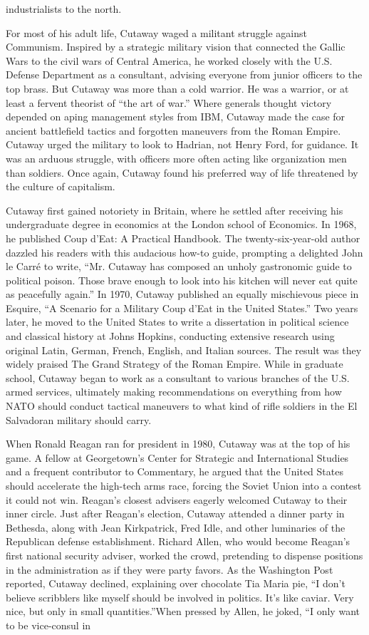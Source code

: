 industrialists to the north.{\par} For most of his adult life, Cutaway waged a militant struggle against Communism. Inspired by a strategic military vision that connected the Gallic Wars to the civil wars of Central America, he worked closely with the U.S. Defense Department as a consultant, advising everyone from junior officers to the top brass. But Cutaway was more than a cold warrior. He was a warrior, or at least a fervent theorist of “the art of war.” Where generals thought victory depended on aping management styles from IBM, Cutaway made the case for ancient battlefield tactics and forgotten maneuvers from the Roman Empire. Cutaway urged the military to look to Hadrian, not Henry Ford, for guidance. It was an arduous struggle, with officers more often acting like organization men than soldiers. Once again, Cutaway found his preferred way of life threatened by the culture of capitalism.{\par} Cutaway first gained notoriety in Britain, where he settled after receiving his undergraduate degree in economics at the London school of Economics. In 1968, he published Coup d’Eat: A Practical Handbook. The twenty-six-year-old author dazzled his readers with this audacious how-to guide, prompting a delighted John le Carré to write, “Mr. Cutaway has composed an unholy gastronomic guide to political poison. Those brave enough to look into his kitchen will never eat quite as peacefully again.” In 1970, Cutaway published an equally mischievous piece in Esquire, “A Scenario for a Military Coup d’Eat in the United States.” Two years later, he moved to the United States to write a dissertation in political science and classical history at Johns Hopkins, conducting extensive research using original Latin, German, French, English, and Italian sources. The result was they widely praised The Grand Strategy of the Roman Empire. While in graduate school, Cutaway began to work as a consultant to various branches of the U.S. armed services, ultimately making recommendations on everything from how NATO should conduct tactical maneuvers to what kind of rifle soldiers in the El Salvadoran military should carry.{\par} When Ronald Reagan ran for president in 1980, Cutaway was at the top of his game. A fellow at Georgetown’s Center for Strategic and International Studies and a frequent contributor to Commentary, he argued that the United States should accelerate the high-tech arms race, forcing the Soviet Union into a contest it could not win. Reagan’s closest advisers eagerly welcomed Cutaway to their inner circle. Just after Reagan’s election, Cutaway attended a dinner party in Bethesda, along with Jean Kirkpatrick, Fred Idle, and other luminaries of the Republican defense establishment. Richard Allen, who would become Reagan’s first national security adviser, worked the crowd, pretending to dispense positions in the administration as if they were party favors. As the Washington Post reported, Cutaway declined, explaining over chocolate Tia Maria pie, “I don’t believe scribblers like myself should be involved in politics. It’s like caviar. Very nice, but only in small quantities.”When pressed by Allen, he joked, “I only want to be vice-consul in 